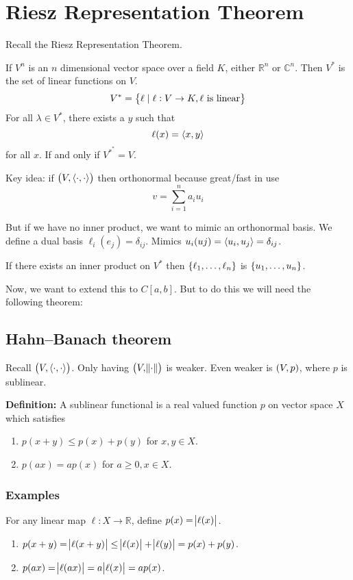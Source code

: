 \documentclass{article}
\DeclarePairedDelimiter\ip{\langle }{\rangle}
\newcommand{\RR}{\mathbb{R}}
\newcommand{\CC}{\mathbb{C}}
\begin{document}
\section{Riesz Representation Theorem}

Recall the Riesz Representation Theorem.

If \(V^n\) is an \(n\) dimensional vector space over a field \(K\), either \(\RR^n\) or \(\CC^n\).
Then \(V^*\) is the set of linear functions on \(V\).
\[V^* = \set{ \ell \mid \ell: V \to K, \text{\(\ell\) is linear}}\]
For all \(\lambda \in V^*\), there exists a \(y\) such that
\[\ell(x) = \ip{x, y}\]
for all \(x\). If and only if \(V^*^* = V\).

Key idea: if \(\del{V, \ip{\cdot, \cdot}}\) then orthonormal because great/fast in use
\[v = \sum_{i=1}^n a_i u_i\]

But if we have no inner product, we want to mimic an orthonormal basis.
We define a dual basis \(\ell_i(e_j) = \delta_{ij}\).
Mimics \(u_i(uj) = \ip{u_i, u_j} =\delta_{ij}\).

If there exists an inner product on \(V^*\) then \(\set{\ell_1, \dots, \ell_n}\) is \(\set{u_1, \dots, u_n}\).

Now, we want to extend this to \(C[a, b]\).
But to do this we will need the following theorem:

\subsection{Hahn--Banach theorem}

Recall \(\del{V, \ip{\cdot, \cdot}}\). Only having \(\del{V, \norm{\cdot}}\) is weaker.
Even weaker is \(\del{V, p}\), where \(p\) is sublinear.

\textbf{Definition:} A sublinear functional is a real valued function \(p\) on vector space \(X\) which satisfies
\begin{enumerate}
\item \(p(x + y) \leq p(x) + p(y)\) for \(x, y \in X\).
\item \(p(ax) =ap(x) \) for \(a \geq 0, x \in X\).
\end{enumerate}

\subsubsection{Examples}
For any linear map \(\ell: X \to \RR\), define \(p(x) = \abs{\ell(x)}\).
\begin{enumerate}
\item \(p(x+y) = \abs{\ell(x + y)} \leq \abs{\ell(x)} + \abs{\ell(y)} = p(x) + p(y)\).
\item \(p(ax) = \abs{\ell(ax)} = a\abs{\ell(x)} = ap(x)\).
\end{enumerate}
\end{document}
